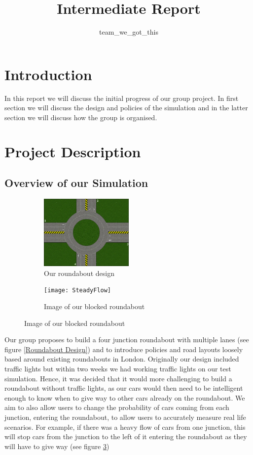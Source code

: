 \documentclass[11pt]{article}
\title{{Intermediate Report}}
\date{}
\author{team\_we\_got\_this}
\begin{document}
	\maketitle
	\thispagestyle{fancy}
	\section{Introduction}
	In this report we will discuss the initial progress of our group project. In first section we will discuss the design and policies of the simulation and in the latter section we will discuss how the group is organised.
	
	
	\section{Project Description}
	
	\subsection{Overview of our Simulation}
	\begin{figure}
		\begin{subfigure}{.45\textwidth}
		\centering
		\includegraphics[width=0.5\textwidth]{Roundabout2}
		\caption{Our roundabout design}
		\label{RoundaboutDesign}
		\end{subfigure}
		\begin{subfigure}{.45\textwidth}
		\centering
		\texttt{[image: SteadyFlow]}
		\caption{Image of our blocked roundabout}
		\label{Steadyflow}
		\end{subfigure}
	\end{figure}
	Our group proposes to build a four junction roundabout with multiple lanes (see figure \ref{Roundabout Design}) and to introduce policies and road layouts loosely based around existing roundabouts in London. Originally our design included traffic lights but within two weeks we had working traffic lights on our test simulation. Hence, it was decided that it would more challenging to build a roundabout without traffic lights, as our cars would then need to be intelligent enough to know when to give way to other cars already on the roundabout. We aim to also allow users to change the probability of cars coming from each junction, entering the roundabout, to allow users to accurately measure real life scenarios. For example, if there was a heavy flow of cars from one junction, this will stop cars from the junction to the left of it entering the roundabout as they will have to give way (see figure \ref{Steadyflow})
	
\end{document}
